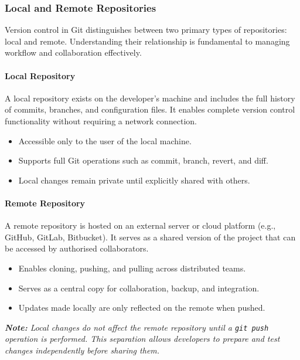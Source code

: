 \documentclass{article}
\newcommand{\codecmd}[1]{\textcolor[rgb]{0,0.5,0}{\texttt{#1}}}
\begin{document}
\subsubsection{Local and Remote Repositories}

Version control in Git distinguishes between two primary types of repositories: local and remote. Understanding their relationship is fundamental to managing workflow and collaboration effectively.

\paragraph*{Local Repository}
A local repository exists on the developer's machine and includes the full history of commits, branches, and configuration files. It enables complete version control functionality without requiring a network connection.

\begin{itemize}
    \item Accessible only to the user of the local machine.
    \item Supports full Git operations such as commit, branch, revert, and diff.
    \item Local changes remain private until explicitly shared with others.
\end{itemize}

\paragraph*{Remote Repository}
A remote repository is hosted on an external server or cloud platform (e.g., GitHub, GitLab, Bitbucket). It serves as a shared version of the project that can be accessed by authorised collaborators.

\begin{itemize}
    \item Enables cloning, pushing, and pulling across distributed teams.
    \item Serves as a central copy for collaboration, backup, and integration.
    \item Updates made locally are only reflected on the remote when pushed.
\end{itemize}

\noindent\textit{\textbf{Note:} Local changes do not affect the remote repository until a \codecmd{git push} operation is performed. This separation allows developers to prepare and test changes independently before sharing them.}
\end{document}
